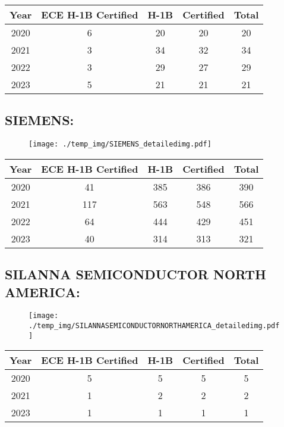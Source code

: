 \documentclass{article}%
\begin{document}
%
\begin{longtable}{c|c|c|c|c}%
\hline%
Year&ECE H{-}1B Certified&H{-}1B&Certified&Total\\%
\hline%
2020&6&20&20&20\\%
\hline%
2021&3&34&32&34\\%
\hline%
2022&3&29&27&29\\%
\hline%
2023&5&21&21&21\\%
\hline%
\end{longtable}

%
\newpage%
\subsection{SIEMENS:}%
\label{subsec:SIEMENS}%
\label{SIEMENSdetailed}%


\begin{figure}[htbp]%
\centering%
\texttt{[image: ./temp\_img/SIEMENS\_detailedimg.pdf]}%
\end{figure}

%
\begin{longtable}{c|c|c|c|c}%
\hline%
Year&ECE H{-}1B Certified&H{-}1B&Certified&Total\\%
\hline%
2020&41&385&386&390\\%
\hline%
2021&117&563&548&566\\%
\hline%
2022&64&444&429&451\\%
\hline%
2023&40&314&313&321\\%
\hline%
\end{longtable}

%
\newpage%
\subsection{SILANNA SEMICONDUCTOR NORTH AMERICA:}%
\label{subsec:SILANNASEMICONDUCTORNORTHAMERICA}%
\label{SILANNASEMICONDUCTORNORTHAMERICAdetailed}%


\begin{figure}[htbp]%
\centering%
\texttt{[image: ./temp\_img/SILANNASEMICONDUCTORNORTHAMERICA\_detailedimg.pdf]}%
\end{figure}

%
\begin{longtable}{c|c|c|c|c}%
\hline%
Year&ECE H{-}1B Certified&H{-}1B&Certified&Total\\%
\hline%
2020&5&5&5&5\\%
\hline%
2021&1&2&2&2\\%
\hline%
2023&1&1&1&1\\%
\hline%
\end{longtable}
\end{document}
